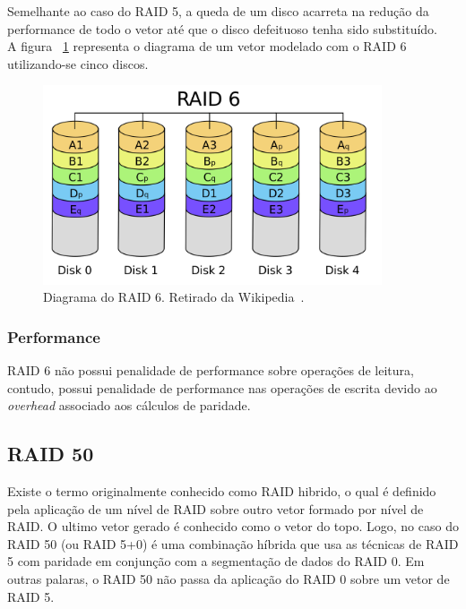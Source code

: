 		Semelhante ao caso do RAID 5, a queda de um disco acarreta na redução da performance de todo o vetor até que o disco defeituoso tenha sido substituído.\\

		
		A figura ~\ref{fig:raid6} representa o diagrama de um vetor modelado com o RAID 6 utilizando-se cinco discos.\\
		
		\begin{figure}[htb]
			\begin{center}
				
				\includegraphics[clip,width=10.0cm]{images/RAID_6.png}
				\caption{Diagrama do RAID 6. Retirado da Wikipedia~\citep{wikiRAIDlevels}.}
				\label{fig:raid6}
			\end{center}
		\end{figure} 
		
		\subsubsection{Performance}
		RAID 6 não possui penalidade de performance sobre operações de leitura, contudo, possui penalidade de performance nas operações de escrita devido ao \textit{overhead} associado aos cálculos de paridade.\\
		
		
		\subsection{RAID 50}
		Existe o termo originalmente conhecido como RAID hibrido, o qual é definido pela aplicação de um nível de RAID sobre outro vetor formado por nível de RAID. O ultimo vetor gerado é conhecido como o 
		vetor do topo. Logo, no caso do RAID 50 (ou RAID 5+0) é uma combinação híbrida que usa as técnicas de RAID 5 com paridade em conjunção com a segmentação de dados do RAID 0. Em outras palaras, o RAID 50 não passa da aplicação do RAID 0 sobre um vetor de RAID 5. \\
		
